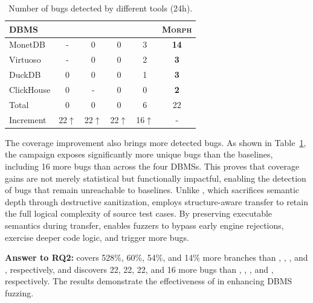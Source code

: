 \documentclass[conference]{IEEEtran}
\begin{document}
\begin{table}[!b]
\centering
\caption{Number of bugs detected by different tools (24h).}
\label{tab:bugs}
{\scriptsize
\setlength{\tabcolsep}{2pt}
\begin{tabular*}{\columnwidth}{@{\extracolsep{\fill}}lccccc@{}}
    \toprule
    \textbf{DBMS} & \sqlancer{} & \squirrel{} & \griffin{} & \sedar{} & \textsc{Morph} \\
    \midrule
    MonetDB    & - & 0 & 0 & 3 & \textbf{14} \\
    Virtuoso   & - & 0 & 0 & 2 & \textbf{3} \\
    DuckDB     & 0 & 0 & 0 & 1 & \textbf{3} \\
    ClickHouse & 0 & - & 0 & 0 & \textbf{2} \\
    \midrule
    Total      & 0 & 0 & 0 & 6 & 22 \\
    Increment  & 22$\uparrow$ & 22$\uparrow$ & 22$\uparrow$ & 16$\uparrow$ & - \\
    \bottomrule
\end{tabular*}
}
\end{table}

The coverage improvement also brings more detected bugs.
As shown in Table~\ref{tab:bugs}, the campaign exposes significantly more unique bugs than the baselines, including 16 more bugs than \sedar{} across the four DBMSs. 
This proves that coverage gains are not merely statistical but functionally impactful, enabling the detection of bugs that remain unreachable to baselines.
Unlike \sedar{}, which sacrifices semantic depth through destructive sanitization, \tool{} employs structure-aware transfer to retain the full logical complexity of source test cases. By preserving executable semantics during transfer, \tool{} enables fuzzers to bypass early engine rejections, exercise deeper code logic, and trigger more bugs.


\begin{answerbox}
\textbf{Answer to RQ2:} \tool{} covers 528\%, 60\%, 54\%, and 14\% more branches than \sqlancer{}, \squirrel{}, \griffin{}, and \sedar{}, respectively, and discovers 22, 22, 22, and 16 more bugs than \sqlancer{}, \squirrel{}, \griffin{}, and \sedar{}, respectively. 
The results demonstrate the effectiveness of \tool{} in enhancing DBMS fuzzing.
\end{answerbox}
\end{document}
